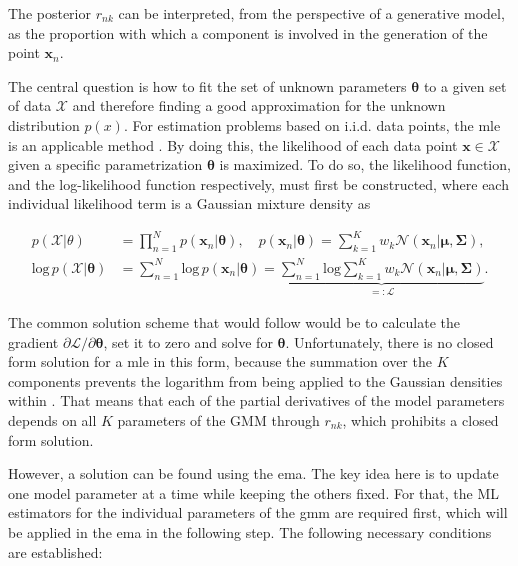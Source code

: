 \documentclass[../../../main.tex]{subfiles}
\begin{document}
The posterior $r_{nk}$ can be interpreted, from the perspective of a generative model, as the proportion with which a component is involved in the generation of the point $\bm{x}_n$.

The central question is how to fit the set of unknown parameters $\bm{\theta}$ to a given set of data $\mathcal{X}$ and therefore finding a good approximation for the unknown distribution $p(x)$. For estimation problems based on i.i.d. data points, the \gls{mle} is an applicable method \cite[p. 317]{dei_2020}. By doing this, the likelihood of each data point $\bm{x} \in \mathcal{X}$ given a specific parametrization $\bm{\theta}$ is maximized. To do so, the likelihood function, and the log-likelihood function respectively, must first be constructed, where each individual likelihood term is a Gaussian mixture density as

\begin{equation*}
    \begin{aligned}
        p(\mathcal{X}|\theta) &= \prod\limits_{n=1}^Np(\bm{x}_n|\bm{\theta}), \quad p(\bm{x}_n|\bm{\theta})=\sum\limits^K_{k=1}w_k\mathcal{N}(\bm{x}_n| \bm{\mu}, \bm{\Sigma}),\\[5pt]
        \mathrm{log} \, p(\mathcal{X}|\bm{\theta}) &= \sum\limits_{n=1}^N \mathrm{log} \, p(\bm{x}_n|\bm{\theta}) = \underbrace{ \sum\limits_{n=1}^N \mathrm{log} \sum\limits_{k=1}^K w_k \mathcal{N}(\bm{x}_n | \bm{\mu}, \bm{\Sigma})}_{=:\mathcal{L}}.
    \end{aligned}
\end{equation*}

The common solution scheme that would follow would be to calculate the gradient $\partial{\mathcal{L}}/\partial{\bm{\theta}}$, set it to zero and solve for $\bm{\theta}$. Unfortunately, there is no closed form solution for a \gls{mle} in this form, because the summation over the $K$ components prevents the logarithm from being applied to the Gaussian densities within \cite[p. 435]{bis_2006}. That means that each of the partial derivatives of the model parameters depends on all $K$ parameters of the GMM through $r_{nk}$, which prohibits a closed form solution. 

However, a solution can be found using the \gls{ema}. The key idea here is to update one model parameter at a time while keeping the others fixed. For that, the ML estimators for the individual parameters of the \gls{gmm} are required first, which will be applied in the \gls{ema} in the following step. The following necessary conditions are established:
\end{document}

